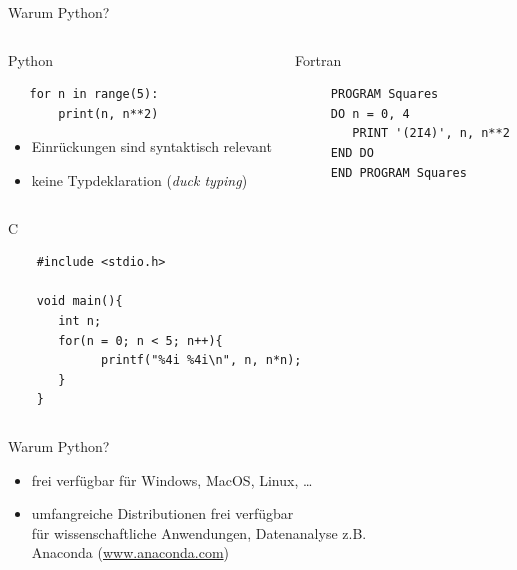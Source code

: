 \documentclass[t, utf8, 10pt]{beamer}
\begin{document}
\begin{frame}[fragile]{Warum Python?}

 \vspace{0.3truecm}
 \begin{columns}[t]
  \begin{column}{0.5\textwidth}
   Python
   \lstset{style=custompython}
   \begin{lstlisting}
   for n in range(5):
       print(n, n**2)
   \end{lstlisting}

   \begin{footnotesize}
    \begin{itemize}
     \setlength{\itemindent}{-10pt}
     \item Einrückungen sind syntaktisch relevant
     \item keine Typdeklaration (\textit{duck typing})
    \end{itemize}
   \end{footnotesize}
  \end{column}
  \begin{column}{0.5\textwidth}
   Fortran
   \lstset{style=customfortran}
   \begin{lstlisting}
     PROGRAM Squares
     DO n = 0, 4
        PRINT '(2I4)', n, n**2
     END DO
     END PROGRAM Squares
   \end{lstlisting}
  \end{column}
 \end{columns}
  
 \vspace{0.5truecm}
 \begin{columns}
  \begin{column}{0.7\textwidth}
   C
   \lstset{style=customc}
   \begin{lstlisting}
    #include <stdio.h>

    void main(){
       int n;
       for(n = 0; n < 5; n++){
             printf("%4i %4i\n", n, n*n);
       }
    }
   \end{lstlisting}
  \end{column}
  \begin{column}{0.3\textwidth}
   \strut
  \end{column}
 \end{columns}
\end{frame}

\begin{frame}{Warum Python?}
 \begin{itemize}
  \item frei verfügbar für Windows, MacOS, Linux, \ldots
  \item umfangreiche Distributionen frei verfügbar\\
        für wissenschaftliche Anwendungen, Datenanalyse z.B.\\
        Anaconda (\url{www.anaconda.com})
 \end{itemize}
\end{frame}
\end{document}
